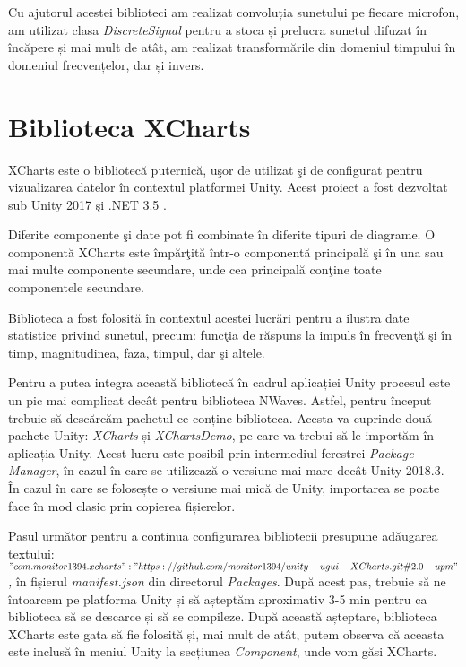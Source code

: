 	Cu ajutorul acestei biblioteci am realizat convoluția sunetului pe fiecare microfon, am utilizat clasa \textit{DiscreteSignal} pentru a stoca și prelucra sunetul difuzat în încăpere și mai mult de atât, am realizat transformările din domeniul timpului în domeniul frecvențelor, dar și invers.
	
	
\section{Biblioteca XCharts}
	XCharts este o bibliotec\u{a} puternic\u{a}, u\c{s}or de utilizat \c{s}i de configurat pentru vizualizarea datelor \^{i}n contextul platformei Unity. Acest proiect a fost dezvoltat sub Unity 2017 \c{s}i .NET 3.5 \cite{xcharts}.
	
	Diferite componente \c{s}i date pot fi  combinate \^{i}n diferite tipuri de diagrame. O component\u{a} XCharts este \^{i}mp\u{a}r\c{t}it\u{a} \^{i}ntr-o component\u{a} principal\u{a} \c{s}i \^{i}n una sau mai multe componente secundare, unde cea principal\u{a} con\c{t}ine toate componentele secundare. 	 
	
	Biblioteca a fost folosit\u{a} \^{i}n contextul acestei lucr\u{a}ri pentru a ilustra date statistice privind sunetul, precum: func\c{t}ia de r\u{a}spuns la impuls \^{i}n frecven\c{t}\u{a} \c{s}i \^{i}n timp, magnitudinea, faza, timpul, dar \c{s}i altele.
	
	Pentru a putea integra această bibliotecă în cadrul aplicației Unity procesul este un pic mai complicat decât pentru biblioteca NWaves. Astfel, pentru început trebuie să descărcăm pachetul ce conține biblioteca. Acesta va cuprinde două pachete Unity: \textit{XCharts} și \textit{XChartsDemo}, pe care va trebui să le importăm în aplicația Unity. Acest lucru este posibil prin intermediul ferestrei \textit{Package Manager}, în cazul în care se utilizează o versiune mai mare decât Unity 2018.3. În cazul în care se folosește o versiune mai mică de Unity, importarea se poate face în mod clasic prin copierea fișierelor.
	
	Pasul următor pentru a continua configurarea bibliotecii presupune adăugarea textului: \textit{$"com.monitor1394.xcharts": "https://github.com/monitor1394/unity-ugui-XCharts.git\#2.0-upm"$,} în fișierul \textit{manifest.json} din directorul \textit{Packages}. După acest pas, trebuie să ne întoarcem pe platforma Unity și să așteptăm aproximativ 3-5 min pentru ca biblioteca să se descarce și să se compileze. După această așteptare, biblioteca XCharts este gata să fie folosită și, mai mult de atât, putem observa că aceasta este inclusă în meniul Unity la secțiunea \textit{Component}, unde vom găsi XCharts.
	
